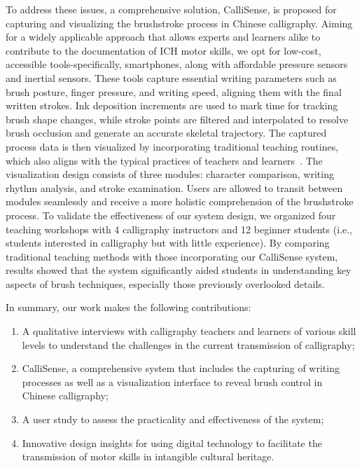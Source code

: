 To address these issues, a comprehensive solution, CalliSense, is proposed for capturing and visualizing the brushstroke process in Chinese calligraphy. Aiming for a widely applicable approach that allows experts and learners alike to contribute to the documentation of ICH motor skills, we opt for low-cost, accessible tools-specifically, smartphones, along with affordable pressure sensors and inertial sensors. These tools capture essential writing parameters such as brush posture, finger pressure, and writing speed, aligning them with the final written strokes. 
Ink deposition increments are used to mark time for tracking brush shape changes, while stroke points are filtered and interpolated to resolve brush occlusion and generate an accurate skeletal trajectory.
The captured process data is then visualized by incorporating traditional teaching routines, which also aligns with the typical practices of teachers and learners~\cite{ifenthaler2016learning}. The visualization design consists of three modules: character comparison, writing rhythm analysis, and stroke examination. Users are allowed to transit between modules seamlessly and receive a more holistic comprehension of the brushstroke process.
To validate the effectiveness of our system design, we organized four teaching workshops with 4 calligraphy instructors and 12 beginner students (i.e., students interested in calligraphy but with little experience). By comparing traditional teaching methods with those incorporating our CalliSense system, results showed that the system significantly aided students in understanding key aspects of brush techniques, especially those previously overlooked details.


In summary, our work makes the following contributions:

\begin{enumerate}
    \item A qualitative interviews with calligraphy teachers and learners of various skill levels to understand the challenges in the current transmission of calligraphy;
    \item CalliSense, a comprehensive system that includes the capturing of writing processes as well as a visualization interface to reveal brush control in Chinese calligraphy;
    \item A user study to assess the practicality and effectiveness of the system;
    \item Innovative design insights for using digital technology to facilitate the transmission of motor skills in intangible cultural heritage.
\end{enumerate}
